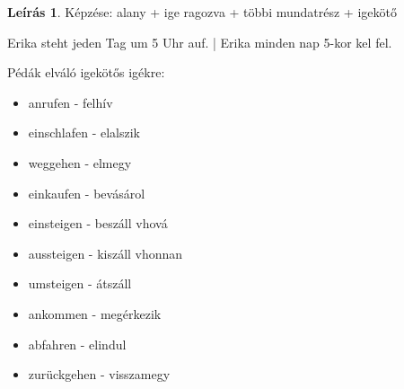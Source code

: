 \documentclass{article}
\theoremstyle{definition}
\newtheorem*{desc}{Leírás}
\begin{document}
\begin{desc}
Képzése: alany + ige ragozva + többi mundatrész + igekötő

Erika steht jeden Tag um 5 Uhr auf. | Erika minden nap 5-kor kel fel.

Pédák elváló igekötős igékre:
\begin{itemize}
\item anrufen - felhív
\item einschlafen - elalszik
\item weggehen - elmegy
\item einkaufen - bevásárol
\item einsteigen - beszáll vhová
\item aussteigen - kiszáll vhonnan
\item umsteigen - átszáll
\item ankommen - megérkezik
\item abfahren - elindul
\item zurückgehen - visszamegy
\end{itemize}

\end{desc}
\end{document}
